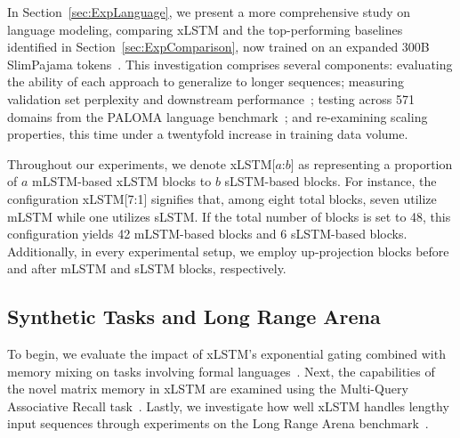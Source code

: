 In Section~\ref{sec:ExpLanguage}, we present a more comprehensive study on language modeling, comparing xLSTM and the top-performing baselines identified in Section~\ref{sec:ExpComparison}, now trained on an expanded 300B SlimPajama tokens~\citep{Soboleva:23}. This investigation comprises several components: evaluating the ability of each approach to generalize to longer sequences; measuring validation set perplexity and downstream performance~\citep{Sutawika:24}; testing across 571 domains from the PALOMA language benchmark~\citep{Magnusson:23arxivshort}; and re-examining scaling properties, this time under a twentyfold increase in training data volume.

\label{sec:xlstm_blocks_notation}
Throughout our experiments, we denote xLSTM[$a$:$b$] as representing a proportion of $a$ mLSTM-based xLSTM blocks to $b$ sLSTM-based blocks. For instance, the configuration xLSTM[7:1] signifies that, among eight total blocks, seven utilize mLSTM while one utilizes sLSTM. If the total number of blocks is set to 48, this configuration yields 42 mLSTM-based blocks and 6 sLSTM-based blocks. Additionally, in every experimental setup, we employ up-projection blocks before and after mLSTM and sLSTM blocks, respectively.

\subsection{Synthetic Tasks and Long Range Arena}
\label{sec:ExpSyntethic}
To begin, we evaluate the impact of xLSTM's exponential gating combined with memory mixing on tasks involving formal languages~\citep{Deletang:23}. Next, the capabilities of the novel matrix memory in xLSTM are examined using the Multi-Query Associative Recall task~\citep{Arora:23arxiv}. Lastly, we investigate how well xLSTM handles lengthy input sequences through experiments on the Long Range Arena benchmark~\citep{Tay:21}.

